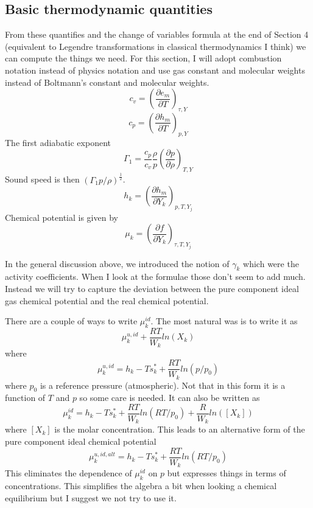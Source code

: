 \documentclass[11pt]{article}
\newcommand{\half}{\frac{1}{2}}
\begin{document}
\subsection{Basic thermodynamic quantities}

From these quantifies and the change of variables formula at the end of Section 4 (equivalent to Legendre
transformations in classical thermodynamics I think) we can compute the things we need.
For this section, I will adopt combustion notation instead of physics notation and use gas constant
and molecular weights instead of Boltmann's constant and molecular weights.  
\[
c_v = \left( \frac{\partial e_m}{\partial T}\right)_{\tau,Y}
\]
\[
c_p = \left( \frac{\partial h_m}{\partial T}\right)_{p,Y}
\]
The first adiabatic exponent
\[
\Gamma_1 = \frac{c_p}{c_v} \frac{\rho}{p} 
\left( \frac{\partial p}{\partial \rho}\right)_{T,Y}
\]
Sound speed is then $(\Gamma_1 p / \rho)^\half$.
\[
h_k = \left( \frac{\partial h_m}{\partial Y_k}\right)_{p,T,Y_j}
\]
Chemical potential is given by
\[
\mu_k = \left( \frac{\partial f}{\partial Y_k}\right)_{\tau,T,Y_j}
\]

In the general discussion above, we introduced the notion of $\gamma_k$ which were the activity coefficients.
When I look at the formulae those don't seem to add much.
Instead we will try to capture the deviation between the pure component ideal gas chemical potential and
the real chemical potential.

There are a couple of ways to write $\mu_k^{id}$.
The most natural was is to write it as
\[
\mu_k^{u,id} + \frac{R T}{W_k} ln (X_k)
\]
where 
\begin{equation}
\mu_k^{u,id} = h_k - T s_k^* + \frac{R T}{W_k} ln(p/p_0)
\label{eq:chem_uid_frac}
\end{equation}
where $p_0$ is a reference pressure (atmospheric).
Not that in this form it is a function of $T$ and $p$ so some care is needed.
It can also be written as
\begin{equation}
\mu_k^{id} = h_k - T s_k^* + \frac{R T}{W_k} ln(RT/p_0) + \frac{R}{W_k} ln([X_k])
\end{equation}
where $[X_k]$ is the molar concentration.
This leads to an alternative form of the pure component ideal chemical potential
\begin{equation}
\mu_k^{u,id,alt} = h_k - T s_k^* + \frac{R T}{W_k} ln(RT/p_0)
\label{eq:chem_uid_conc}
\end{equation}
This eliminates the dependence of $\mu_k^{id}$ on $p$ but expresses things in terms of
concentrations.  This simplifies the algebra a bit when looking a chemical equilibrium but
I suggest we not try to use it.
\end{document}
